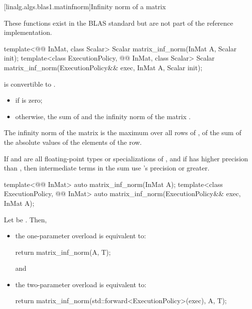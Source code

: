 [linalg.algs.blas1.matinfnorm]{Infinity norm of a matrix}

\pnum
\begin{note}
These functions exist in the BLAS standard\supercite{blas-std}
but are not part of the reference implementation.
\end{note}

\begin{itemdecl}
template<@@ InMat, class Scalar>
  Scalar matrix_inf_norm(InMat A, Scalar init);
template<class ExecutionPolicy, @@ InMat, class Scalar>
  Scalar matrix_inf_norm(ExecutionPolicy&& exec, InMat A, Scalar init);
\end{itemdecl}

\begin{itemdescr}
\pnum
\mandates
{}
is convertible to .

\pnum
\returns
\begin{itemize}
\item
{} if  is zero;
\item
otherwise,
the sum of  and the infinity norm of the matrix .
\end{itemize}
\begin{note}
The infinity norm of the matrix 
is the maximum over all rows of ,
of the sum of the absolute values
of the elements of the row.
\end{note}

\pnum
\remarks
If  and 
are all floating-point types or specializations of ,
and if  has higher precision
than ,
then intermediate terms in the sum use 's precision or greater.
\end{itemdescr}

\begin{itemdecl}
template<@@ InMat>
  auto matrix_inf_norm(InMat A);
template<class ExecutionPolicy, @@ InMat>
  auto matrix_inf_norm(ExecutionPolicy&& exec, InMat A);
\end{itemdecl}

\begin{itemdescr}

\pnum
\effects
Let  be
.
Then,
\begin{itemize}
\item
the one-parameter overload is equivalent to:
\begin{codeblock}
return matrix_inf_norm(A, T{});
\end{codeblock}
and
\item
the two-parameter overload is equivalent to:
\begin{codeblock}
return matrix_inf_norm(std::forward<ExecutionPolicy>(exec), A, T{});
\end{codeblock}
\end{itemize}
\end{itemdescr}

